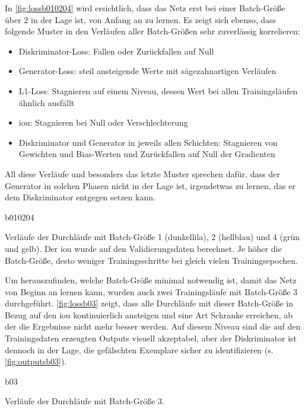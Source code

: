 In \autoref{fig:lossb010204} wird ersichtlich, dass das Netz erst bei einer Batch-Größe über 2 in der Lage ist, von Anfang an zu lernen.
Es zeigt sich ebenso, dass folgende Muster in den Verläufen aller Batch-Größen sehr zuverlässig korrelieren:

\begin{itemize}
	\item Diskriminator-Loss: Fallen oder Zurückfallen auf Null 
	\item Generator-Loss: steil ansteigende Werte mit sägezahnartigen Verläufen
	\item L1-Loss: Stagnieren auf einem Niveau, dessen Wert bei allen Trainingsläufen ähnlich ausfällt
	\item \gls{iou}: Stagnieren bei Null oder Verschlechterung
	\item Diskriminator und Generator in jeweils allen Schichten: Stagnieren von Gewichten und Bias-Werten und Zurückfallen auf Null der Gradienten
\end{itemize}

All diese Verläufe und besonders das letzte Muster sprechen dafür, dass der Generator in solchen Phasen nicht in der Lage ist, irgendetwas zu lernen, das er dem Diskriminator entgegen setzen kann.

\begin{losses}{b010204}
	\caption{Verläufe der Durchläufe mit Batch-Größe 1 (dunkellila), 2 (hellblau) und 4 (grün und gelb). Der \gls{iou} wurde auf den Validierungsdaten berechnet. Je höher die Batch-Größe, desto weniger Trainingsschritte bei gleich vielen Trainingsepochen.}
	\label{fig:lossb010204}
\end{losses}


Um herauszufinden, welche Batch-Größe minimal notwendig ist, damit das Netz von Beginn an lernen kann, wurden auch zwei Trainingsläufe mit Batch-Größe 3 durchgeführt.
\autoref{fig:lossb03} zeigt, dass alle Durchläufe mit dieser Batch-Größe in Bezug auf den \gls{iou} kontinuierlich ansteigen und eine Art Schranke erreichen, ab der die Ergebnisse nicht mehr besser werden.
Auf diesem Niveau sind die auf den Trainingsdaten erzeugten Outputs visuell akzeptabel, aber der Diskriminator ist dennoch in der Lage, die gefälschten Exemplare sicher zu identifizieren (s. \autoref{fig:outputsb03}).

\begin{losses}{b03}
	\caption{Verläufe der Durchläufe mit Batch-Größe 3.}
	\label{fig:lossb03}
\end{losses}

